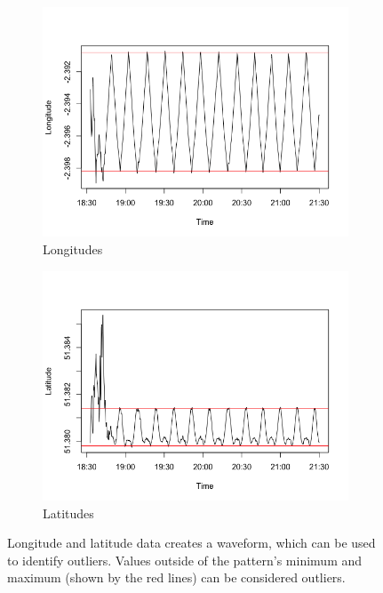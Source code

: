 \documentclass[11pt]{report}
\begin{document}
\begin{figure}[!tb]
    \centering
    \begin{minipage}{1\linewidth}
            \begin{subfigure}[t]{.5\linewidth}
                \includegraphics[width=\textwidth]{images/wave_longitudes}
                \caption{Longitudes}
                \label{fig:wave_longitudes}
            \end{subfigure}
            \begin{subfigure}[t]{.5\linewidth}
            	\includegraphics[width=\textwidth]{images/wave_latitudes}
            	\caption{Latitudes}
            	\label{fig:wave_latitudes}
	   \end{subfigure}
        \end{minipage}
    \caption{Longitude and latitude data creates a waveform, which can be used to identify outliers. Values outside of the pattern's minimum and maximum (shown by the red lines) can be considered outliers.}
    \label{fig:waves}
\end{figure}
\end{document}
